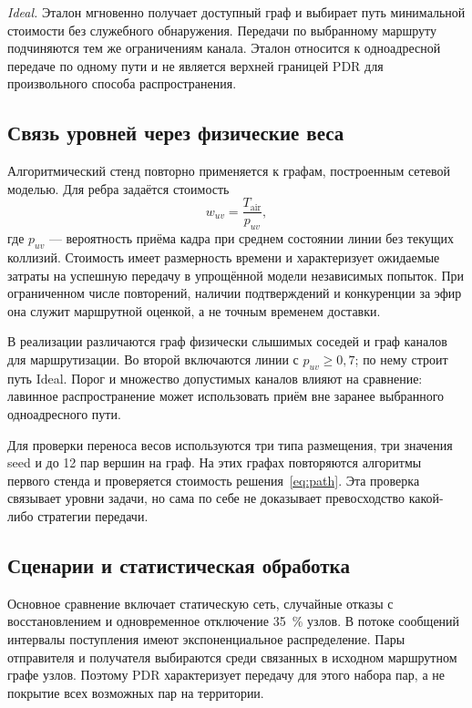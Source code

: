 \textit{Ideal.} Эталон мгновенно получает доступный граф и выбирает путь минимальной стоимости без служебного обнаружения. Передачи по выбранному маршруту подчиняются тем же ограничениям канала. Эталон относится к одноадресной передаче по одному пути и не является верхней границей PDR для произвольного способа распространения.

\subsection{Связь уровней через физические веса}

Алгоритмический стенд повторно применяется к графам, построенным сетевой моделью. Для ребра задаётся стоимость
\begin{equation}
  w_{uv}=\frac{T_{\mathrm{air}}}{p_{uv}},
  \label{eq:weight}
\end{equation}
где $p_{uv}$ --- вероятность приёма кадра при среднем состоянии линии без текущих коллизий. Стоимость имеет размерность времени и характеризует ожидаемые затраты на успешную передачу в упрощённой модели независимых попыток. При ограниченном числе повторений, наличии подтверждений и конкуренции за эфир она служит маршрутной оценкой, а не точным временем доставки.

В реализации различаются граф физически слышимых соседей и граф каналов для маршрутизации. Во второй включаются линии с $p_{uv}\geq0{,}7$; по нему строит путь Ideal. Порог и множество допустимых каналов влияют на сравнение: лавинное распространение может использовать приём вне заранее выбранного одноадресного пути.

Для проверки переноса весов используются три типа размещения, три значения seed и до 12 пар вершин на граф. На этих графах повторяются алгоритмы первого стенда и проверяется стоимость решения~\eqref{eq:path}. Эта проверка связывает уровни задачи, но сама по себе не доказывает превосходство какой-либо стратегии передачи.

\subsection{Сценарии и статистическая обработка}

Основное сравнение включает статическую сеть, случайные отказы с восстановлением и одновременное отключение 35~\% узлов. В потоке сообщений интервалы поступления имеют экспоненциальное распределение. Пары отправителя и получателя выбираются среди связанных в исходном маршрутном графе узлов. Поэтому PDR характеризует передачу для этого набора пар, а не покрытие всех возможных пар на территории.


